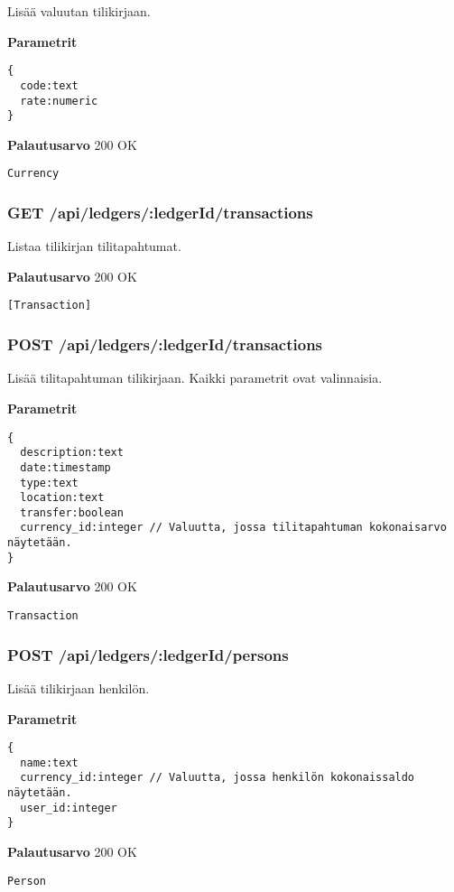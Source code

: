 Lisää valuutan tilikirjaan.

\textbf{Parametrit}
\begin{Verbatim}
{
  code:text
  rate:numeric
}
\end{Verbatim}

\textbf{Palautusarvo}
200 OK
\begin{Verbatim}
Currency
\end{Verbatim}

\subsubsection{GET /api/ledgers/:ledgerId/transactions}

Listaa tilikirjan tilitapahtumat.

\textbf{Palautusarvo}
200 OK
\begin{Verbatim}
[Transaction]
\end{Verbatim}

\subsubsection{POST /api/ledgers/:ledgerId/transactions}

Lisää tilitapahtuman tilikirjaan. Kaikki parametrit ovat valinnaisia.

\textbf{Parametrit}
\begin{Verbatim}
{
  description:text
  date:timestamp
  type:text
  location:text
  transfer:boolean
  currency_id:integer // Valuutta, jossa tilitapahtuman kokonaisarvo näytetään.
}
\end{Verbatim}

\textbf{Palautusarvo}
200 OK
\begin{Verbatim}
Transaction
\end{Verbatim}

\subsubsection{POST /api/ledgers/:ledgerId/persons}

Lisää tilikirjaan henkilön.

\textbf{Parametrit}
\begin{Verbatim}
{
  name:text
  currency_id:integer // Valuutta, jossa henkilön kokonaissaldo näytetään.
  user_id:integer
}
\end{Verbatim}

\textbf{Palautusarvo}
200 OK
\begin{Verbatim}
Person
\end{Verbatim}

